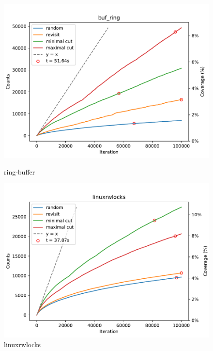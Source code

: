 \begin{figure}[h!]

	\centering
	\begin{minipage}{0.45\textwidth}
		\centering
		\includegraphics[width=\textwidth]{figure/genmc/buf_ring.pdf}
		\caption{ring-buffer}
		\label{genmc:buf_ring}
	\end{minipage}
	\hfill
	\begin{minipage}{0.45\textwidth}
		\centering
		\includegraphics[width=\textwidth]{figure/genmc/linuxrwlocks.pdf}
		\caption{linuxrwlocks}
		\label{genmc:linuxrwlocks}
	\end{minipage}

	\vspace{0.5cm}


\end{figure}
